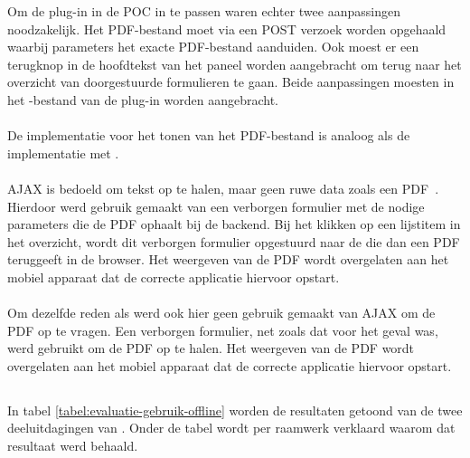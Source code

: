 Om de plug-in in de POC in te passen waren echter twee aanpassingen noodzakelijk.
Het PDF-bestand moet via een POST verzoek worden opgehaald waarbij parameters het exacte PDF-bestand aanduiden.
Ook moest er een terugknop in de hoofdtekst van het paneel worden aangebracht om terug naar het overzicht van doorgestuurde formulieren te gaan.
Beide aanpassingen moesten in het \js-bestand van de plug-in worden aangebracht.

\paragraph{\kendo}
De implementatie voor het tonen van het PDF-bestand is analoog als de implementatie met \jqm{}.

\paragraph{\jqm}
AJAX is bedoeld om tekst op te halen, maar geen ruwe data zoals een PDF~\cite{Scott2009}. 
Hierdoor werd gebruik gemaakt van een verborgen formulier met de nodige parameters die de PDF ophaalt bij de backend. 
Bij het klikken op een lijstitem in het overzicht, wordt dit verborgen formulier opgestuurd naar de  die dan een PDF teruggeeft in de browser. 
Het weergeven van de PDF wordt overgelaten aan het mobiel apparaat dat de correcte applicatie hiervoor opstart.

\paragraph{\lungo}
Om dezelfde reden als \jqm{} werd ook hier geen gebruik gemaakt van AJAX om de PDF op te vragen.
Een verborgen formulier, net zoals dat voor \jqm{} het geval was, werd gebruikt om de PDF op te halen.
Het weergeven van de PDF wordt overgelaten aan het mobiel apparaat dat de correcte applicatie hiervoor opstart.


\subsection{}
\label{sec:evaluatie-gebruik-offline}

In tabel \ref{tabel:evaluatie-gebruik-offline} worden de resultaten getoond van de twee deeluitdagingen van .
Onder de tabel wordt per raamwerk verklaard waarom dat resultaat werd behaald.

